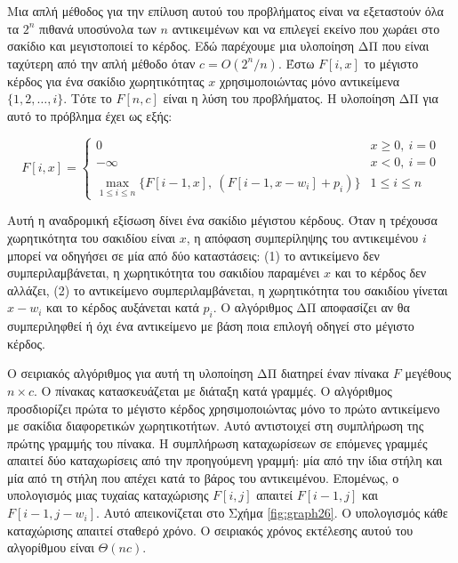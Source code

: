 \documentclass[12pt,a4paper]{article} %
\begin{document}
{{Μια απλή μέθοδος για την επίλυση αυτού του προβλήματος είναι να
εξεταστούν όλα τα $2^n$ πιθανά υποσύνολα των $n$ αντικειμένων και να
επιλεγεί εκείνο που χωράει στο σακίδιο και μεγιστοποιεί το κέρδος.
Εδώ παρέχουμε μια υλοποίηση ΔΠ που είναι ταχύτερη από την απλή
μέθοδο όταν $c = O(2^n/n)$. Έστω $F[i, x]$ το μέγιστο κέρδος για
ένα σακίδιο χωρητικότητας $x$ χρησιμοποιώντας μόνο αντικείμενα
$\{1, 2, \ldots, i\}$. Τότε το $F[n, c]$ είναι η λύση του
προβλήματος. Η υλοποίηση ΔΠ για αυτό το πρόβλημα έχει ως εξής:

\[
F[i, x] =
\begin{cases}
0 & x \geq 0,\ i = 0 \\[4pt]
-\infty & x < 0,\ i = 0 \\[4pt]
\displaystyle \max_{1 \leq i \leq n}\{F[i-1, x],\ \left(F[i-1, x - w_i] + p_i\right)\}
  & 1 \leq i \leq n
\end{cases}
\]
\vspace{0.2cm}

Αυτή η αναδρομική εξίσωση δίνει ένα σακίδιο μέγιστου κέρδους. Όταν η
τρέχουσα χωρητικότητα του σακιδίου είναι $x$, η απόφαση συμπερίληψης
του αντικειμένου $i$ μπορεί να οδηγήσει σε μία από δύο καταστάσεις:
(1) το αντικείμενο δεν συμπεριλαμβάνεται, η χωρητικότητα του σακιδίου
παραμένει $x$ και το κέρδος δεν αλλάζει, (2) το αντικείμενο
συμπεριλαμβάνεται, η χωρητικότητα του σακιδίου γίνεται $x - w_i$ και
το κέρδος αυξάνεται κατά $p_i$. Ο αλγόριθμος ΔΠ αποφασίζει αν θα
συμπεριληφθεί ή όχι ένα αντικείμενο με βάση ποια επιλογή οδηγεί στο
μέγιστο κέρδος.

Ο σειριακός αλγόριθμος για αυτή τη υλοποίηση ΔΠ διατηρεί έναν πίνακα
$F$ μεγέθους $n \times c$. Ο πίνακας κατασκευάζεται με διάταξη κατά γραμμές. 
Ο αλγόριθμος προσδιορίζει πρώτα το μέγιστο κέρδος
χρησιμοποιώντας μόνο το πρώτο αντικείμενο με σακίδια διαφορετικών
χωρητικοτήτων. Αυτό αντιστοιχεί στη συμπλήρωση της πρώτης γραμμής
του πίνακα. Η συμπλήρωση καταχωρίσεων σε επόμενες γραμμές απαιτεί
δύο καταχωρίσεις από την προηγούμενη γραμμή: μία από την ίδια στήλη
και μία από τη στήλη που απέχει κατά το βάρος του αντικειμένου.
Επομένως, ο υπολογισμός μιας τυχαίας καταχώρισης $F[i, j]$ απαιτεί
$F[i-1, j]$ και $F[i-1, j-w_i]$. Αυτό απεικονίζεται στο Σχήμα \ref{fig:graph26}.
Ο υπολογισμός κάθε καταχώρισης απαιτεί σταθερό χρόνο. Ο σειριακός
χρόνος εκτέλεσης αυτού του αλγορίθμου είναι $\Theta(nc)$.

\begin{figure}[H]
\centering
\begin{tikzpicture}[scale=1.1]


\end{tikzpicture}
\end{figure}}}
\end{document}
